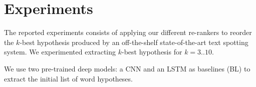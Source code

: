 \documentclass[phd,tocprelim]{cornell}
\begin{document}



\section{Experiments}
The reported experiments consists of applying our different re-rankers to reorder the $k$-best hypothesis produced by an off-the-shelf state-of-the-art text spotting system. We experimented extracting $k$-best hypothesis for $k=3..10$.

We use two pre-trained deep models: a CNN \cite{jaderberg2016reading} and an LSTM \cite{ghosh2017visual} as baselines (BL) to extract the initial list of word hypotheses.
\end{document}
